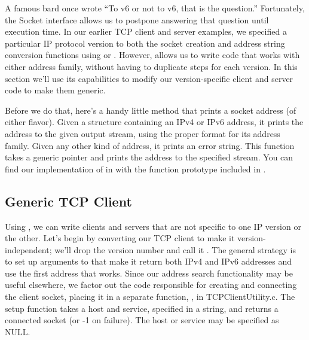 A famous bard once wrote ``To v6 or not to v6, that is the question.''
Fortunately, the Socket interface allows us to postpone answering that
question until execution time.  In our earlier TCP client and server
examples, we specified a particular IP protocol version to both the socket
creation and address string conversion functions using
 or .  However,
 allows us to write code
that works with either address family, without having to
duplicate steps for each version.  In this section we'll use
its capabilities to modify our version-specific client and server
code to make them generic.

Before we do that, here's
a handy little method that prints a socket address
(of either flavor).
Given a  structure containing an IPv4 or IPv6 address,
it prints the address to the given output stream, using the proper
format for its address family.
Given any other kind of address, it prints an error string.
This function takes a generic 
pointer and prints the address to the specified stream.  You can find
our implementation of  in 
with the function prototype included in .


\subsection{Generic TCP Client}

Using , we can write clients
and servers that are not specific to one IP version or the other.
Let's begin by converting our TCP client to make it
version-independent; we'll drop the version number and
call it .
The general strategy is to set up arguments to 
that make it return both IPv4 and IPv6 addresses and use the
first address that works.
Since our address search functionality may be useful elsewhere, we factor
out the code responsible for creating
and connecting the client socket, placing it in a separate function,
, in TCPClientUtility.c.  The setup function
takes a host and service, specified in a string, and returns a connected
socket (or -1 on failure).  The host or service may be specified as NULL.


